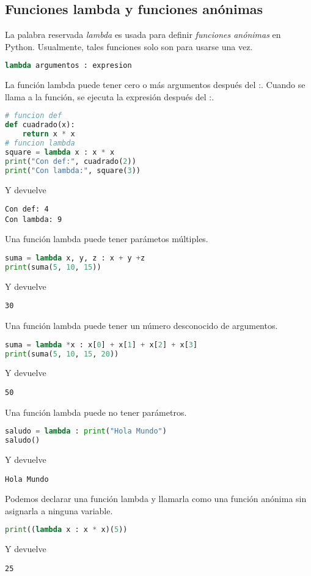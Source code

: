 	\subsection{Funciones lambda y funciones anónimas}
	La palabra reservada \emph{lambda} es usada para definir \emph{funciones anónimas} en Python. Usualmente, tales funciones solo son para usarse una vez.
	\begin{lstlisting}[language = {python}]
lambda argumentos : expresion
	\end{lstlisting}
	La función lambda puede tener cero o más argumentos después del :. Cuando se llama a la función, se ejecuta la expresión después del :.
	\begin{lstlisting}[language = {python}]
# funcion def
def cuadrado(x):
    return x * x
# funcion lambda
square = lambda x : x * x
print("Con def:", cuadrado(2))
print("Con lambda:", square(3))
	\end{lstlisting}
	Y devuelve
	\begin{lstlisting}[language = {[latex]tex}]
Con def: 4
Con lambda: 9
	\end{lstlisting}
	Una función lambda puede tener parámetos múltiples.
	\begin{lstlisting}[language = {python}]
suma = lambda x, y, z : x + y +z
print(suma(5, 10, 15))
	\end{lstlisting}
	Y devuelve
	\begin{lstlisting}[language = {[latex]tex}]
30
	\end{lstlisting}
	Una función lambda puede tener un número desconocido de argumentos.
	\begin{lstlisting}[language = {python}]
suma = lambda *x : x[0] + x[1] + x[2] + x[3]
print(suma(5, 10, 15, 20))
	\end{lstlisting}
	Y devuelve
	\begin{lstlisting}[language = {[latex]tex}]
50
	\end{lstlisting}
	Una función lambda puede no tener parámetros.
	\begin{lstlisting}[language = {python}]
saludo = lambda : print("Hola Mundo")
saludo()
	\end{lstlisting}
	Y devuelve
	\begin{lstlisting}[language = {[latex]tex}]
Hola Mundo
	\end{lstlisting}
	Podemos declarar una función lambda y llamarla como una función anónima sin asignarla a ninguna variable.
    \begin{lstlisting}[language = {python}]
print((lambda x : x * x)(5))
    \end{lstlisting}
    Y devuelve
    \begin{lstlisting}[language = {[latex]tex}]
25
    \end{lstlisting}